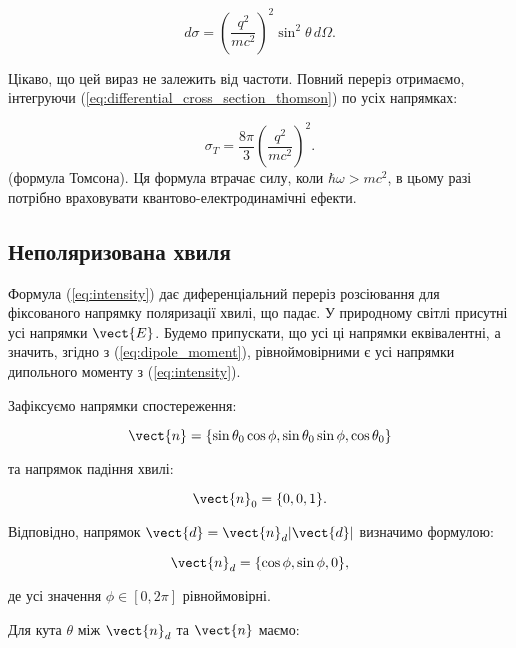 \begin{equation}
d\sigma = \left( \frac{q^2}{mc^2} \right)^2 \sin^2 \theta \, d\Omega.
\label{eq:differential_cross_section_thomson}
\end{equation}

Цікаво, що цей вираз не залежить від частоти. Повний переріз отримаємо, інтегруючи (\ref{eq:differential_cross_section_thomson}) по усіх напрямках:

\begin{equation}
\sigma_T = \frac{8\pi}{3} \left( \frac{q^2}{mc^2} \right)^2.
\label{eq:thomson_cross_section}
\end{equation}
(формула Томсона). Ця формула втрачає силу, коли \( \hbar \omega > mc^2 \), в цьому разі потрібно враховувати квантово-електродинамічні ефекти.


\subsection*{Неполяризована хвиля}

Формула (\ref{eq:intensity}) дає диференціальний переріз розсіювання для фіксованого напрямку поляризації хвилі, що падає. У природному світлі присутні
усі напрямки \( \vect{E} \). Будемо припускати, що усі ці напрямки еквівалентні, а значить, згідно з (\ref{eq:dipole_moment}), рівноймовірними є усі
напрямки дипольного моменту з (\ref{eq:intensity}).

Зафіксуємо напрямки спостереження:

\begin{equation*}
\vect{n} = \{\sin \theta_0 \cos \phi, \sin \theta_0 \sin \phi, \cos \theta_0\}
\end{equation*}

та напрямок падіння хвилі:

\begin{equation*}
\vect{n}_0 = \{0, 0, 1\}.
\end{equation*}

Відповідно, напрямок \( \vect{d} = \vect{n}_d |\vect{d}| \) визначимо формулою:

\begin{equation*}
\vect{n}_d = \{\cos \phi, \sin \phi, 0\},
\end{equation*}

де усі значення \( \phi \in [0, 2\pi] \) рівноймовірні.

Для кута \( \theta \) між \( \vect{n}_d \) та \( \vect{n} \) маємо:

